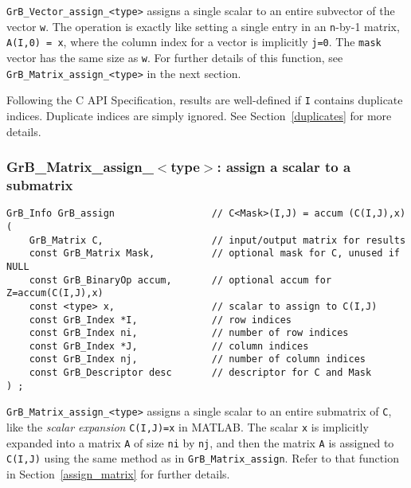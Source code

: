 \documentclass[12pt]{article}
\begin{document}
\verb'GrB_Vector_assign_<type>' assigns a single scalar to an entire subvector
of the vector \verb'w'.  The operation is exactly like setting a single entry
in an \verb'n'-by-1 matrix, \verb'A(I,0) = x', where the column index for a
vector is implicitly \verb'j=0'.  The \verb'mask' vector has the same size as
\verb'w'.  For further details of this function, see
\verb'GrB_Matrix_assign_<type>' in the next section.

Following the C API Specification, results are well-defined if \verb'I'
contains duplicate indices.  Duplicate indices are simply ignored.  See
Section~\ref{duplicates} for more details.

\subsubsection{{\sf GrB\_Matrix\_assign\_$<$type$>$:} assign a scalar to a submatrix}
\label{assign_matrix_scalar}

\begin{mdframed}[userdefinedwidth=6in]
{\footnotesize
\begin{verbatim}
GrB_Info GrB_assign                 // C<Mask>(I,J) = accum (C(I,J),x)
(
    GrB_Matrix C,                   // input/output matrix for results
    const GrB_Matrix Mask,          // optional mask for C, unused if NULL
    const GrB_BinaryOp accum,       // optional accum for Z=accum(C(I,J),x)
    const <type> x,                 // scalar to assign to C(I,J)
    const GrB_Index *I,             // row indices
    const GrB_Index ni,             // number of row indices
    const GrB_Index *J,             // column indices
    const GrB_Index nj,             // number of column indices
    const GrB_Descriptor desc       // descriptor for C and Mask
) ;
\end{verbatim} } \end{mdframed}

\verb'GrB_Matrix_assign_<type>' assigns a single scalar to an entire
submatrix of \verb'C', like the {\em scalar expansion} \verb'C(I,J)=x' in
MATLAB.  The scalar \verb'x' is implicitly expanded into a matrix \verb'A' of
size \verb'ni' by \verb'nj', and then the matrix \verb'A' is assigned to
\verb'C(I,J)' using the same method as in \verb'GrB_Matrix_assign'.  Refer
to that function in Section~\ref{assign_matrix} for further details.
\end{document}
